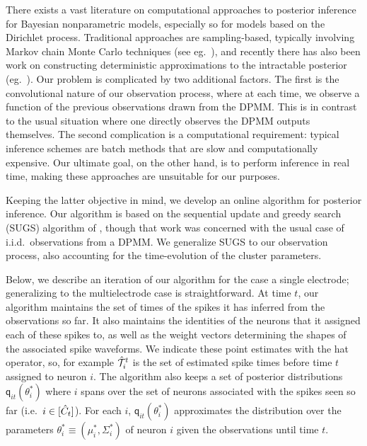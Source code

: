 \newcommand{\tx}{\tilde{x}}
\newcommand{\resx}{\delta{\bx}^L}


There exists a vast literature on computational approaches to posterior inference for Bayesian nonparametric models, especially so for models based on the 
Dirichlet process.
Traditional approaches are sampling-based, typically involving Markov chain Monte Carlo techniques (see eg.\ \citep{Nea2000, IshJam2001}), 
and recently there has also been work on constructing deterministic approximations to the intractable posterior (eg.\ \citep{BleJor2006, MinGha2003}).
Our problem is complicated by two additional factors. The first is the convolutional nature of our observation process, 
where at each time,
we observe a function of the previous observations drawn from the DPMM. This is in contrast to the usual situation where one directly observes 
the DPMM outputs themselves.
The second complication is a computational requirement: typical inference schemes are batch methods that are slow and computationally expensive. 
Our ultimate goal, on the other hand, is to perform inference in real time, making these approaches are unsuitable for our purposes.

Keeping the latter objective in mind, we develop an online algorithm for posterior inference. Our algorithm is based on the sequential update and
greedy search (SUGS) algorithm of
\citep{WangDun2009}, though that work was concerned with the usual case of i.i.d.\ observations from a DPMM. We generalize SUGS to our 
observation process, also accounting for the time-evolution of the cluster parameters.

Below, we describe an iteration of our algorithm for the case a single electrode; %
generalizing to the multielectrode case is straightforward. 
At time $t$, our algorithm maintains the set of times of the spikes it has inferred from the observations so far. It also maintains
the identities of the neurons that it assigned each of these spikes to, as well as the weight vectors determining the shapes of the associated spike 
waveforms. We indicate these point estimates with the hat operator, so, for example $\hat{\mathcal{T}}^t_i$ is the set of estimated spike times before time $t$ assigned
to neuron $i$. The algorithm also keeps a set of posterior distributions $\mathsf{q}_{it}(\theta^*_i)$ where $i$ spans over the
set of neurons associated with the spikes seen so far (i.e.\ $i \in [\hat{C}_t]$). 
For each $i$, $\mathsf{q}_{it}(\theta^*_i)$ approximates the distribution over the parameters 
$\theta_i^* \equiv (\mu_i^*, \Sigma_i^*)$ of neuron $i$ given the observations until time $t$. 

